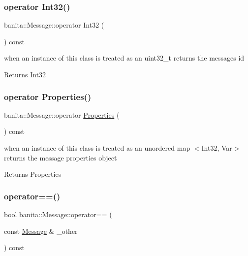 \subsubsection{\texorpdfstring{operator Int32()}{operator Int32()}}
{\footnotesize\ttfamily banita\+::\+Message\+::operator Int32 (\begin{DoxyParamCaption}{ }\end{DoxyParamCaption}) const\hspace{0.3cm}{\ttfamily [inline]}}



when an instance of this class is treated as an uint32\+\_\+t returns the message\textquotesingle{}s id 

\begin{DoxyReturn}{Returns}
Int32 
\end{DoxyReturn}
\mbox{\label{classbanita_1_1_message_ae3d403e037b9c9b58ba11821f98b3489}} 
\subsubsection{\texorpdfstring{operator Properties()}{operator Properties()}}
{\footnotesize\ttfamily banita\+::\+Message\+::operator \mbox{\hyperlink{classbanita_1_1_message_ab38626a5034f095bf7d856e95ab89290}{Properties}} (\begin{DoxyParamCaption}{ }\end{DoxyParamCaption}) const\hspace{0.3cm}{\ttfamily [inline]}}



when an instance of this class is treated as an unordered map $<$Int32, Var$>$ returns the message properties object 

\begin{DoxyReturn}{Returns}
Properties 
\end{DoxyReturn}
\mbox{\label{classbanita_1_1_message_a14f6afe3532703912bab45350dbb848d}} 
\subsubsection{\texorpdfstring{operator==()}{operator==()}}
{\footnotesize\ttfamily bool banita\+::\+Message\+::operator== (\begin{DoxyParamCaption}\item[{const \mbox{\hyperlink{classbanita_1_1_message}{Message}} \&}]{\+\_\+other }\end{DoxyParamCaption}) const\hspace{0.3cm}{\ttfamily [inline]}}

